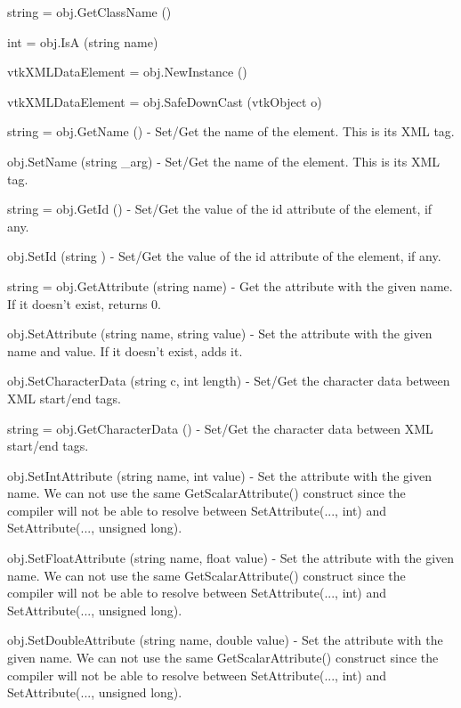 \begin{DoxyItemize}
\item {\ttfamily string = obj.\-Get\-Class\-Name ()}  
\item {\ttfamily int = obj.\-Is\-A (string name)}  
\item {\ttfamily vtk\-X\-M\-L\-Data\-Element = obj.\-New\-Instance ()}  
\item {\ttfamily vtk\-X\-M\-L\-Data\-Element = obj.\-Safe\-Down\-Cast (vtk\-Object o)}  
\item {\ttfamily string = obj.\-Get\-Name ()} -\/ Set/\-Get the name of the element. This is its X\-M\-L tag.  
\item {\ttfamily obj.\-Set\-Name (string \-\_\-arg)} -\/ Set/\-Get the name of the element. This is its X\-M\-L tag.  
\item {\ttfamily string = obj.\-Get\-Id ()} -\/ Set/\-Get the value of the id attribute of the element, if any.  
\item {\ttfamily obj.\-Set\-Id (string )} -\/ Set/\-Get the value of the id attribute of the element, if any.  
\item {\ttfamily string = obj.\-Get\-Attribute (string name)} -\/ Get the attribute with the given name. If it doesn't exist, returns 0.  
\item {\ttfamily obj.\-Set\-Attribute (string name, string value)} -\/ Set the attribute with the given name and value. If it doesn't exist, adds it.  
\item {\ttfamily obj.\-Set\-Character\-Data (string c, int length)} -\/ Set/\-Get the character data between X\-M\-L start/end tags.  
\item {\ttfamily string = obj.\-Get\-Character\-Data ()} -\/ Set/\-Get the character data between X\-M\-L start/end tags.  
\item {\ttfamily obj.\-Set\-Int\-Attribute (string name, int value)} -\/ Set the attribute with the given name. We can not use the same Get\-Scalar\-Attribute() construct since the compiler will not be able to resolve between Set\-Attribute(..., int) and Set\-Attribute(..., unsigned long).  
\item {\ttfamily obj.\-Set\-Float\-Attribute (string name, float value)} -\/ Set the attribute with the given name. We can not use the same Get\-Scalar\-Attribute() construct since the compiler will not be able to resolve between Set\-Attribute(..., int) and Set\-Attribute(..., unsigned long).  
\item {\ttfamily obj.\-Set\-Double\-Attribute (string name, double value)} -\/ Set the attribute with the given name. We can not use the same Get\-Scalar\-Attribute() construct since the compiler will not be able to resolve between Set\-Attribute(..., int) and Set\-Attribute(..., unsigned long).  

\end{DoxyItemize}

